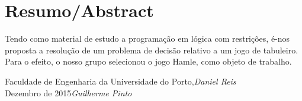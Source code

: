 %
%
%

\chapter*{Resumo/Abstract}

Tendo como material de estudo a programa\c{c}\~ao em l\'ogica com restri\c{c}\~oes, \'e-nos proposta a resolu\c{c}\~ao de um problema de decis\~ao relativo a um jogo de tabuleiro. Para o efeito, o nosso grupo selecionou o jogo Hamle, como objeto de trabalho.


\vspace{\fill}
\begin{flushright}\noindent
Faculdade de Engenharia da Universidade do Porto,\hfill {\it Daniel Reis}\\
Dezembro de 2015\hfill {\it Guilherme Pinto}\\
\end{flushright}